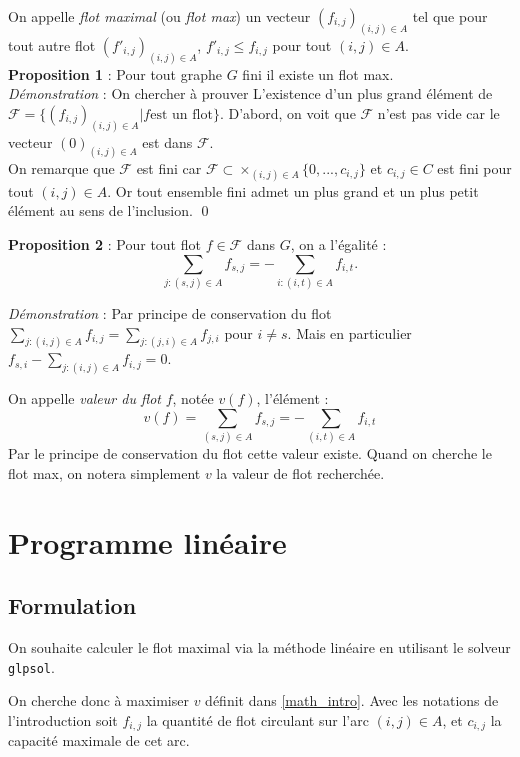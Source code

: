 \documentclass{article}[12pt]
\begin{document}
    On appelle {\it flot maximal} (ou {\it flot max}) un vecteur $(f_{i,j})_{(i,j)\in A}$ tel que pour tout autre flot $(f'_{i,j})_{(i,j)\in A}$, $f'_{i,j} \leq f_{i,j}$ pour tout $(i,j) \in A$.\\
    
    {\bf Proposition 1} : Pour tout graphe $G$ fini il existe un flot max. \\
    
    {\it Démonstration} : On chercher à prouver L'existence d'un plus grand élément de $\mathcal{F} = \lbrace (f_{i,j})_{(i,j) \in A} | f \text{est un flot} \rbrace$. D'abord, on voit que $\mathcal{F}$ n'est pas vide car le vecteur $(0)_{(i,j) \in A}$ est dans $\mathcal{F}$.\\
    On remarque que $\mathcal{F}$ est fini car $\mathcal{F} \subset \times_{(i,j)\in A} \lbrace 0,...,c_{i,j}\rbrace $ et $c_{i,j} \in C$ est fini pour tout $(i,j) \in A$. Or tout ensemble fini admet un plus grand et un plus petit élément au sens de l'inclusion. \qed

{\bf Proposition 2} : Pour tout flot $f \in \mathcal{F}$ dans $G$, on a l'égalité : $$ \sum_{j : (s,j) \in A} f_{s,j} = -\sum_{i : (i,t) \in A} f_{i,t}. $$    
    
    {\it Démonstration} : Par principe de conservation du flot $\sum_{j : (i,j) \in A} f_{i,j} = \sum_{j : (j,i) \in A} f_{j,i}$ pour $i \ne s$. Mais en particulier $f_{s,i} - \sum_{j : (i,j) \in A} f_{i,j} = 0$. %
    
     
    On appelle {\it valeur du flot} $f$, notée $v(f)$, l'élément : $$v(f) = \sum_{(s,j) \in A} f_{s,j} = -\sum_{(i,t) \in A} f_{i,t}$$
    Par le principe de conservation du flot cette valeur existe. Quand on cherche le flot max, on notera simplement $v$ la valeur de flot recherchée. 


\section{Programme linéaire}
    
\subsection{Formulation}

On souhaite calculer le flot maximal via la méthode linéaire en utilisant le solveur \texttt{glpsol}.

On cherche donc à maximiser $v$ définit dans \ref{math_intro}.
Avec les notations de l'introduction soit $f_{i,j}$ la quantité de flot circulant sur l'arc $(i,j) \in A$, et $c_{i,j}$ la capacité maximale de cet arc.
\end{document}
